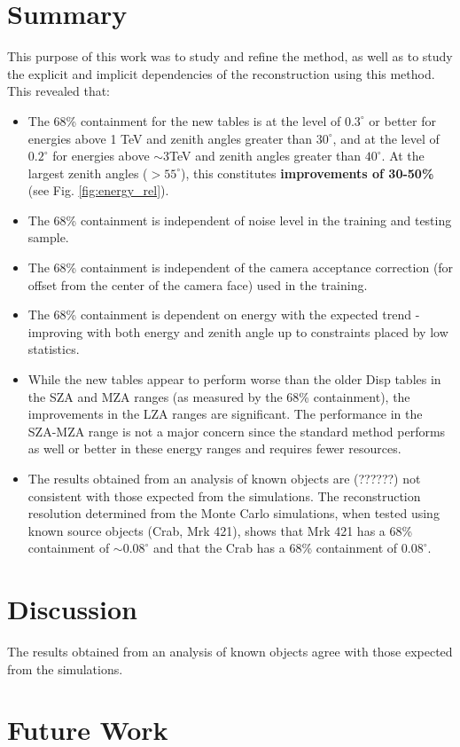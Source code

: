 \documentclass[main.tex]{subfiles}
\begin{document}
\section{Summary}
This purpose of this work was to study and refine the \disp method, as well as to study the explicit and implicit dependencies of the reconstruction using this method. This revealed that:

\begin{itemize}
\item The 68\% containment for the new \disp tables is at the level of $0.3^\circ$ or better for energies above 1 TeV and zenith angles greater than $30^\circ$, and at the level of $0.2^\circ$ for energies above $\sim$3TeV and zenith angles greater than $40^\circ$. At the largest zenith angles ($>55^\circ$), this constitutes {\bf improvements of 30-50\%} (see Fig. \ref{fig:energy_rel}).
\item The 68\% containment is independent of noise level in the training and testing sample.
\item The 68\% containment is independent of the camera acceptance correction (for offset from the center of the camera face) used in the training.
\item The 68\% containment is dependent on energy with the expected trend - improving with both energy and zenith angle up to constraints placed by low statistics.
\item While the new \disp tables appear to perform worse than the older Disp tables in the SZA and MZA ranges (as measured by the 68\% containment), the improvements in the LZA ranges are significant. The performance in the SZA-MZA range is not a major concern since the standard method performs as well or better in these energy ranges and requires fewer resources.
\item The results obtained from an analysis of known objects are (??????)  not consistent with those expected from the simulations. The reconstruction resolution determined from the Monte Carlo simulations, when tested using known source objects (Crab, Mrk 421), shows that Mrk 421 has a 68\% containment of $\sim 0.08^\circ$ and that the Crab has a 68\% containment of $0.08^\circ$.
\end{itemize}

\section{Discussion}
The results obtained from an analysis of known objects agree with those expected from the simulations.

\section{Future Work}
\end{document}

